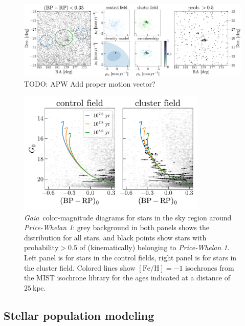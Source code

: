 \documentclass[modern]{aastex62}
\newcommand{\acronym}[1]{{\small{#1}}}
\newcommand{\gaia}{\textsl{Gaia}}
\newcommand{\todo}[1]{{\color{red} TODO: #1}}
\newcommand{\kpc}{\textrm{kpc}}
\newcommand{\feh}{\ensuremath{[\textrm{Fe} / \textrm{H}]}}
\newcommand{\clustername}{\textsl{Price-Whelan 1}}
\newcommand{\isodist}{\ensuremath{25~\kpc}}
\begin{document}
\begin{figure}
\centering
\includegraphics[width=\textwidth]{figures/pm-model.pdf}
\caption{\todo{APW}
Add proper motion vector?}
\label{fig:pm-members}
\end{figure}

\begin{figure}
\centering
\includegraphics[width=0.8\textwidth]{figures/pm-members-cmd.pdf}
\caption{\gaia\ color-magnitude diagrams for stars in the sky region around \clustername: grey background in both panels shows the distribution for all stars, and black points show stars with $\textrm{probability} > 0.5$ of (kinematically) belonging to \clustername.
Left panel is for stars in the control fields, right panel is for stars in the cluster field.
Colored lines show $\feh = -1$ isochrones from the \acronym{MIST} \citep{TODO} isochrone library for the ages indicated at a distance of \isodist.}
\label{fig:pm-members-cmd}
\end{figure}


\subsection{Stellar population modeling}
\label{sec:popmodel}
\end{document}
